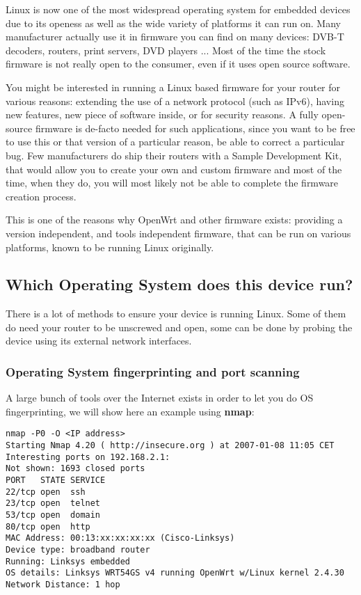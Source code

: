 Linux is now one of the most widespread operating system for embedded devices due
to its openess as well as the wide variety of platforms it can run on. Many
manufacturer actually use it in firmware you can find on many devices: DVB-T 
decoders, routers, print servers, DVD players ... Most of the time the stock 
firmware is not really open to the consumer, even if it uses open source software.

You might be interested in running a Linux based firmware for your router for
various reasons: extending the use of a network protocol (such as IPv6), having
new features, new piece of software inside, or for security reasons. A fully 
open-source firmware is de-facto needed for such applications, since you want to
be free to use this or that version of a particular reason, be able to correct a
particular bug. Few manufacturers do ship their routers with a Sample Development Kit,
that would allow you to create your own and custom firmware and most of the time,
when they do, you will most likely not be able to complete the firmware creation process.

This is one of the reasons why OpenWrt and other firmware exists: providing a 
version independent, and tools independent firmware, that can be run on various 
platforms, known to be running Linux originally.

\subsection{Which Operating System does this device run?}

There is a lot of methods to ensure your device is running Linux. Some of them do
need your router to be unscrewed and open, some can be done by probing the device
using its external network interfaces.

\subsubsection{Operating System fingerprinting and port scanning}

A large bunch of tools over the Internet exists in order to let you do OS 
fingerprinting, we will show here an example using \textbf{nmap}:

\begin{Verbatim}
nmap -P0 -O <IP address>
Starting Nmap 4.20 ( http://insecure.org ) at 2007-01-08 11:05 CET
Interesting ports on 192.168.2.1:
Not shown: 1693 closed ports
PORT   STATE SERVICE
22/tcp open  ssh
23/tcp open  telnet
53/tcp open  domain
80/tcp open  http
MAC Address: 00:13:xx:xx:xx:xx (Cisco-Linksys)
Device type: broadband router
Running: Linksys embedded
OS details: Linksys WRT54GS v4 running OpenWrt w/Linux kernel 2.4.30
Network Distance: 1 hop
\end{Verbatim}

